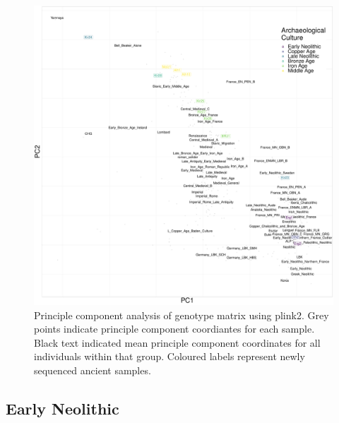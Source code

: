 \begin{figure}[htp]
    \centering
    \includegraphics[width=1.0\textwidth]{../images/chapter4/plink_PCA.pdf}
    \caption{Principle component analysis of genotype matrix using plink2. Grey points indicate principle component coordiantes for each sample. Black text indicated mean principle component coordinates for all individuals within that group. Coloured labels represent newly sequenced ancient samples. }
    \label{fig:plink_PCA}
\end{figure}

\subsection{Early Neolithic}

